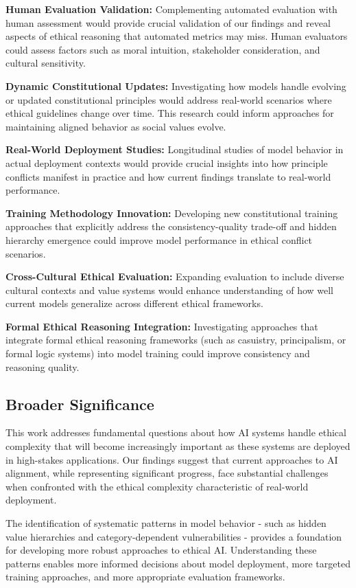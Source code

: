 \documentclass[11pt,a4paper]{article}
\begin{document}
\textbf{Human Evaluation Validation:} Complementing automated evaluation with human assessment would provide crucial validation of our findings and reveal aspects of ethical reasoning that automated metrics may miss. Human evaluators could assess factors such as moral intuition, stakeholder consideration, and cultural sensitivity.

\textbf{Dynamic Constitutional Updates:} Investigating how models handle evolving or updated constitutional principles would address real-world scenarios where ethical guidelines change over time. This research could inform approaches for maintaining aligned behavior as social values evolve.

\textbf{Real-World Deployment Studies:} Longitudinal studies of model behavior in actual deployment contexts would provide crucial insights into how principle conflicts manifest in practice and how current findings translate to real-world performance.

\textbf{Training Methodology Innovation:} Developing new constitutional training approaches that explicitly address the consistency-quality trade-off and hidden hierarchy emergence could improve model performance in ethical conflict scenarios.

\textbf{Cross-Cultural Ethical Evaluation:} Expanding evaluation to include diverse cultural contexts and value systems would enhance understanding of how well current models generalize across different ethical frameworks.

\textbf{Formal Ethical Reasoning Integration:} Investigating approaches that integrate formal ethical reasoning frameworks (such as casuistry, principalism, or formal logic systems) into model training could improve consistency and reasoning quality.

\subsection{Broader Significance}

This work addresses fundamental questions about how AI systems handle ethical complexity that will become increasingly important as these systems are deployed in high-stakes applications. Our findings suggest that current approaches to AI alignment, while representing significant progress, face substantial challenges when confronted with the ethical complexity characteristic of real-world deployment.

The identification of systematic patterns in model behavior - such as hidden value hierarchies and category-dependent vulnerabilities - provides a foundation for developing more robust approaches to ethical AI. Understanding these patterns enables more informed decisions about model deployment, more targeted training approaches, and more appropriate evaluation frameworks.
\end{document}
